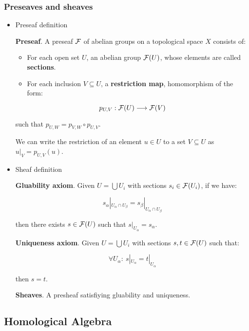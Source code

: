 \documentclass[11pt]{article}
\begin{document}
\subsubsection*{Preseaves and sheaves}
\label{sec-3-1-1}
\begin{itemize}
\item Preseaf definition
\label{sec-3-1-1-1}
\begin{definition}
\textbf{Preseaf}. A preseaf ${\cal F}$ of abelian groups on a topological space $X$ consists of:

\begin{itemize}
\item For each open set $U$, an abelian group ${\cal F}(U)$, whose elements are called 
\textbf{sections}.
\item For each inclusion $V \subseteq U$, a \textbf{restriction map}, homomorphism of the form:
\end{itemize}


\[p_{U,V} : {\cal F}(U) \longrightarrow {\cal F}(V)\]

such that $p_{U,W} = p_{V,W} \circ p_{U,V}$.
\end{definition}

We can write the restriction of an element $u \in U$ to a set $V \subseteq U$ as
$u|_V = p_{U,V}(u)$.

\item Sheaf definition
\label{sec-3-1-1-2}
\begin{definition}
\textbf{Gluability axiom}. Given $U = \bigcup U_i$ with sections $s_i \in {\cal F}(U_i)$, if we have:

\[ s_\alpha|_{U_\alpha \cap U_\beta} = s_\beta|_{U_\alpha \cap U_\beta} \]

then there exists $s \in {\cal F}(U)$ such that $s|_U_\alpha = s_\alpha$.
\end{definition}
\begin{definition}
\textbf{Uniqueness axiom}. Given $U = \bigcup U_i$ with sections $s,t \in {\cal F}(U)$ such that:

\[\forall U_\alpha:\ s|_U_\alpha = t|_U_\alpha\]

then $s=t$.
\end{definition}
\begin{definition}
\textbf{Sheaves}. A presheaf satisfiying gluability and uniqueness.
\end{definition}
\end{itemize}
\subsection*{Homological Algebra}
\label{sec-3-2}
\end{document}
